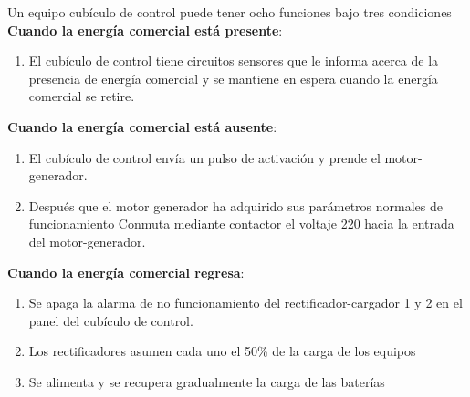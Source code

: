 \documentclass[
	12pt, %
	fleqn, %
	a4paper, %
	oneside, %
]{LegrandOrangeBook}
\begin{document}
\begin{example}
Un equipo cubículo de control puede tener ocho funciones bajo tres condiciones\\
\textbf{Cuando la energía comercial está presente}:
\begin{enumerate}
\item El cubículo de control tiene circuitos sensores que le informa acerca de la presencia de energía comercial y se mantiene en espera cuando la energía comercial se retire.
\end{enumerate}
\textbf{Cuando la energía comercial está ausente}:
\begin{enumerate}
\item El cubículo de control envía un pulso de activación y prende el motor-generador.
\item Después que el motor generador ha adquirido sus parámetros normales de funcionamiento Conmuta mediante contactor el voltaje 220 hacia la entrada del motor-generador.
\end{enumerate}
\textbf{Cuando la energía comercial regresa}:
\begin{enumerate}
\item Se apaga la alarma de no funcionamiento del rectificador-cargador 1 y 2 en el panel del
cubículo de control.
\item Los rectificadores asumen cada uno el 50\% de la carga de los equipos
\item Se alimenta y se recupera gradualmente la carga de las baterías
\end{enumerate}
\end{example}
\end{document}
